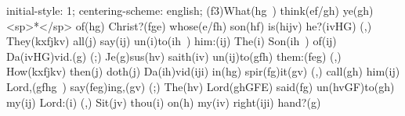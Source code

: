 initial-style: 1;
centering-scheme: english;
(f3)What(hg~) think(ef/gh) ye(gh) <sp>*</sp> of(hg) Christ?(fge) whose(e/fh) son(hf) is(hijv) he?(ivHG) (,) They(kxfjkv) all(j) say(ij) un(i)to(ih~) him:(ij) The(i) Son(ih~) of(ij) Da(ivHG)vid.(g) (;) Je(g)sus(hv) saith(iv) un(ij)to(gfh) them:(feg) (,) How(kxfjkv) then(j) doth(j) Da(ih)vid(iji) in(hg) spir(fg)it(gv) (,) call(gh) him(ij) Lord,(gfhg~) say(feg)ing,(gv) (;) The(hv) Lord(ghGFE) said(fg) un(hvGF)to(gh) my(ij) Lord:(i) (,) Sit(jv) thou(i) on(h) my(iv) right(iji) hand?(g)
